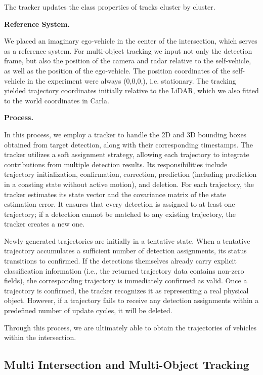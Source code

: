 \documentclass[lettersize,journal]{IEEEtran}
\begin{document}
The tracker updates the class properties of tracks cluster by cluster.

\textbf{Reference System.}

We placed an imaginary ego-vehicle in the center of the intersection, which serves as a reference system. 
For multi-object tracking we input not only the detection frame, but also the position of the camera and radar relative to the self-vehicle, as well as the position of the ego-vehicle. 
The position coordinates of the self-vehicle in the experiment were always (0,0,0,), i.e. stationary. 
The tracking yielded trajectory coordinates initially relative to the LiDAR, which we also fitted to the world coordinates in Carla.

\textbf{Process.}

In this process, we employ a tracker to handle the 2D and 3D bounding boxes obtained from target detection, along with their corresponding timestamps. 
The tracker utilizes a soft assignment strategy, allowing each trajectory to integrate contributions from multiple detection results. 
Its responsibilities include trajectory initialization, confirmation, correction, prediction (including prediction in a coasting state without active motion), and deletion. 
For each trajectory, the tracker estimates its state vector and the covariance matrix of the state estimation error. 
It ensures that every detection is assigned to at least one trajectory; if a detection cannot be matched to any existing trajectory, the tracker creates a new one.

Newly generated trajectories are initially in a tentative state. 
When a tentative trajectory accumulates a sufficient number of detection assignments, its status transitions to confirmed. 
If the detections themselves already carry explicit classification information (i.e., the returned trajectory data contains non-zero fields), the corresponding trajectory is immediately confirmed as valid. 
Once a trajectory is confirmed, the tracker recognizes it as representing a real physical object. 
However, if a trajectory fails to receive any detection assignments within a predefined number of update cycles, it will be deleted.

Through this process, we are ultimately able to obtain the trajectories of vehicles within the intersection.


\subsection{Multi Intersection and Multi-Object Tracking}
\end{document}
